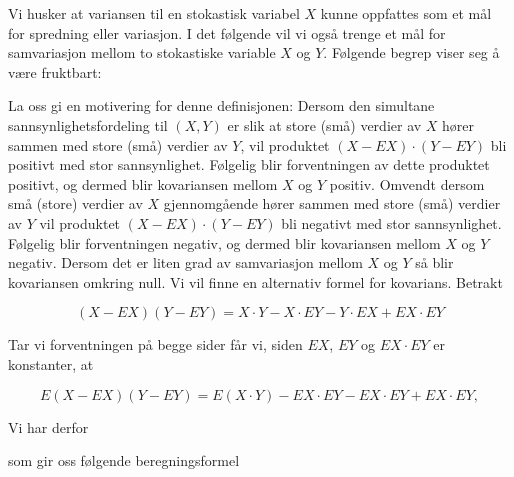 Vi husker at variansen til en stokastisk variabel $X$ kunne
oppfattes som et mål for spredning eller variasjon. I det
følgende vil vi også trenge et mål for samvariasjon mellom to
stokastiske variable $X$ og $Y$. Følgende begrep viser seg å være
fruktbart:

\begin{center}  \end{center}
La oss gi en motivering for denne definisjonen: Dersom den
simultane sannsynlighetsfordeling til $(X,Y)$ er slik at store
(små) verdier av $X$ hører sammen med store (små) verdier av $Y$,
vil produktet $(X-EX)\cdot (Y-EY)$ bli positivt med stor
sannsynlighet. Følgelig blir forventningen av dette produktet
positivt, og dermed blir kovariansen mellom $X$ og $Y$ positiv.
Omvendt dersom små (store) verdier av $X$ gjennomgående hører
sammen med store (små) verdier av $Y$ vil produktet $(X-EX)\cdot(Y-EY)$
 bli negativt med stor sannsynlighet. Følgelig blir
forventningen negativ, og dermed blir kovariansen mellom $X$ og
$Y$ negativ. Dersom det er liten grad av samvariasjon mellom $X$
og $Y$ så blir kovariansen omkring null. Vi vil finne en
alternativ formel for kovarians. Betrakt

\[ (X-EX)(Y-EY)=X\cdot Y-X\cdot EY-Y\cdot EX+EX\cdot EY \]

\noindent Tar vi forventningen på begge sider får vi, siden
 $EX$, $EY$ og $EX\cdot EY$ er konstanter, at

\[ E(X-EX)(Y-EY)=E(X\cdot Y)-EX\cdot EY-EX\cdot EY+EX\cdot EY ,\]

\noindent Vi har derfor
\begin{center} \framebox[10cm]{\begin{minipage}{9cm}
\[ \mbox{\ \ \ C2. \ \ \ \ } cov(X,Y)=E(X\cdot Y)-EX\cdot EY   \]
\mbox{} \end{minipage}} \end{center}
\noindent som gir oss følgende beregningsformel

\begin{center} \framebox[10cm]{\begin{minipage}{9cm}
\[ \mbox{\ \ \ C3. \ \ \ \ } cov(X,Y)=\sum_{(x,y)}xy \cdot p(x,y)-EX\cdot EY \]
\mbox{}\end{minipage}} \end{center}

